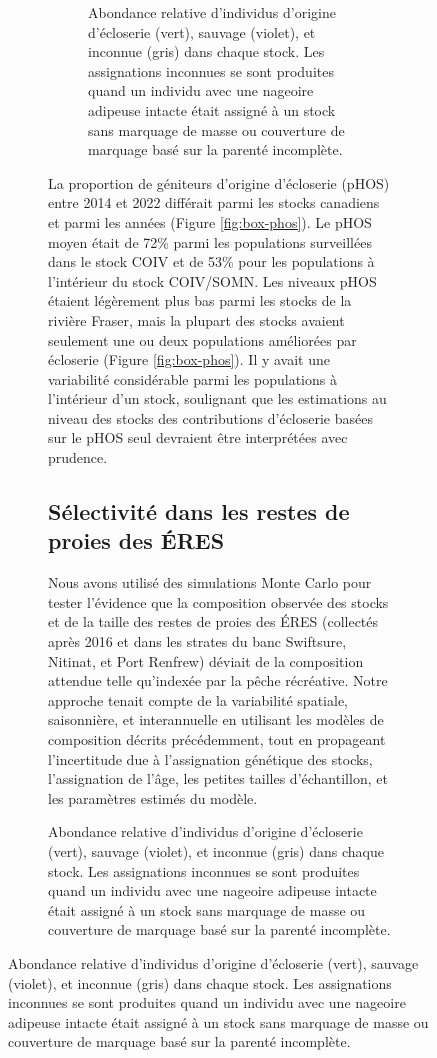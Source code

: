 \begin{figure}[H]
\begin{figure}[H]
\begin{figure}[H]
    \centering
    \caption{Abondance relative d'individus d'origine d'écloserie (vert), sauvage (violet), et inconnue (gris) dans chaque stock. Les assignations inconnues se sont produites quand un individu avec une nageoire adipeuse intacte était assigné à un stock sans marquage de masse ou couverture de marquage basé sur la parenté incomplète.}
    \label{fig:bar-hatchery-stocks}
\end{figure}

La proportion de géniteurs d'origine d'écloserie (pHOS) entre 2014 et 2022 différait parmi les stocks canadiens et parmi les années (Figure \ref{fig:box-phos}). Le pHOS moyen était de 72\% parmi les populations surveillées dans le stock COIV et de 53\% pour les populations à l'intérieur du stock COIV/SOMN. Les niveaux pHOS étaient légèrement plus bas parmi les stocks de la rivière Fraser, mais la plupart des stocks avaient seulement une ou deux populations améliorées par écloserie (Figure \ref{fig:box-phos}). Il y avait une variabilité considérable parmi les populations à l'intérieur d'un stock, soulignant que les estimations au niveau des stocks des contributions d'écloserie basées sur le pHOS seul devraient être interprétées avec prudence.

\subsection{Sélectivité dans les restes de proies des ÉRES}

Nous avons utilisé des simulations Monte Carlo pour tester l'évidence que la composition observée des stocks et de la taille des restes de proies des ÉRES (collectés après 2016 et dans les strates du banc Swiftsure, Nitinat, et Port Renfrew) déviait de la composition attendue telle qu'indexée par la pêche récréative. Notre approche tenait compte de la variabilité spatiale, saisonnière, et interannuelle en utilisant les modèles de composition décrits précédemment, tout en propageant l'incertitude due à l'assignation génétique des stocks, l'assignation de l'âge, les petites tailles d'échantillon, et les paramètres estimés du modèle.


\end{figure}
\end{figure}
